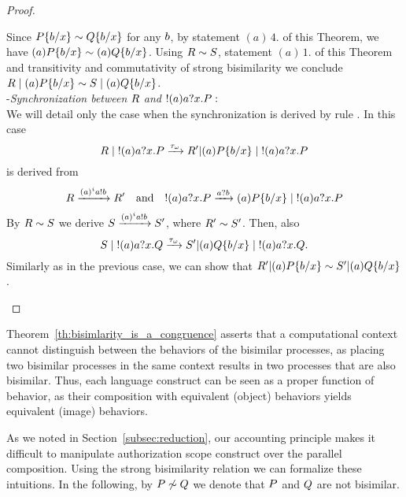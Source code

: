 \begin{proof}
\begin{itemize}
\begin{enumerate}
Since $P\{b/x\}\sim Q\{b/x\}$ for any $b$, by statement $(a)\, 4.$ of this Theorem, 
we have $(a)P\{b/x\}\sim(a)Q\{b/x\}$. 
Using $R\sim S$, statement $(a)\,1.$ of this Theorem and transitivity and commutativity of strong bisimilarity 
we conclude $R \;|\; (a)P\{b/x\}\sim S \;|\; (a)Q\{b/x\}$.
\\
-\emph{Synchronization between} $R$ \emph{and} $!(a)a?x.P:$
\\
We will detail only the case when the synchronization is derived by rule 
. In this case 
\[
R \;|\; !(a)a?x.P \xrightarrow{\tau_\omega} R' | (a)P\{b/x\} \;|\; !(a)a?x.P 
\]
is derived from 
\[
R\xrightarrow{{(a)^i}a!b}R' \quad \mbox{and} \quad !(a)a?x.P\xrightarrow{a?b}(a)P\{b/x\} \;|\; !(a)a?x.P 
\]
By $R\sim S$ we derive $S\xrightarrow{{(a)^i}a!b}S'$, where $R'\sim S'$.
Then, also
\[
S \;|\; !(a)a?x.Q \xrightarrow{\tau_\omega} S' | (a)Q\{b/x\} \;|\; !(a)a?x.Q.
\]
Similarly as in the previous case, we can show that $R' | (a)P\{b/x\}\sim S' | (a)Q\{b/x\}$. %

\end{enumerate}
\end{itemize}
\end{proof}


Theorem~\ref{th:bisimlarity_is_a_congruence} asserts that a computational context cannot distinguish between the behaviors of the bisimilar processes, as placing two bisimilar processes in the same context results in two processes that are also bisimilar. Thus, each language construct can be seen as a proper function of behavior, as their composition with equivalent (object) behaviors yields equivalent (image) behaviors.

As we noted in Section~\ref{subsec:reduction}, our accounting principle makes it difficult to manipulate authorization scope construct over the parallel composition. Using the strong bisimilarity relation we can formalize these intuitions.
In the following, by $P  \not\sim Q$ we denote that $P$ and $Q$ are not bisimilar.

